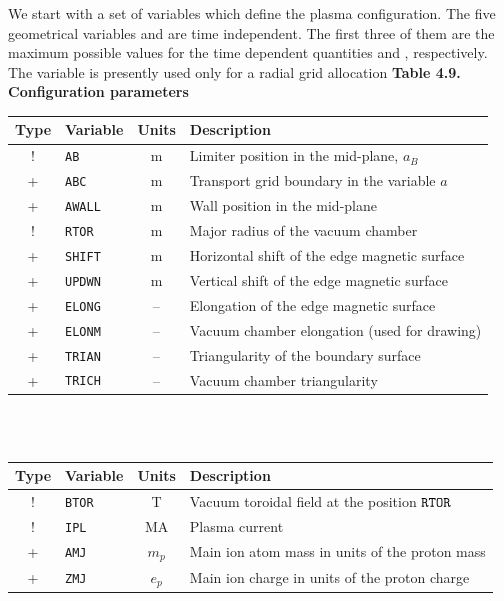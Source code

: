 We start with a set of variables which define the plasma configuration.
The five geometrical variables  and  are time independent.
The first three of them are the maximum possible values for the time
dependent quantities  and , respectively. 
The variable  is  presently used only for a radial grid
allocation 
\linebreak
\indent
{\bf Table 4.9. Configuration parameters}\\[2ex]
\begin{tabular}{|c|l|c|l|}\hline
\hspace*{-1pt}\bf Type\hspace*{-1pt} & \bf Variable 
			&\bf Units &\bf Description\\		\hline
 ! &\tt AB    & m & Limiter position in the mid-plane, $a_B$\\
 + &\tt ABC   & m & Transport grid boundary in the variable $a$\\
 + &\tt AWALL & m & Wall position in the mid-plane\\
 ! &\tt RTOR  & m & Major radius of the vacuum chamber\\
 + &\tt SHIFT & m & Horizontal shift of the edge magnetic surface\\
 + &\tt UPDWN & m & Vertical shift of the edge magnetic surface\\
 + &\tt ELONG & -- & Elongation of the edge magnetic surface\\
 + &\tt ELONM & -- & Vacuum chamber elongation (used for drawing)\\
 + &\tt TRIAN & -- & Triangularity of the boundary surface\\
 + &\tt TRICH & -- & Vacuum chamber triangularity	\\	\hline
\end{tabular}
\bigskip\\
\\[2ex]
\begin{tabular}{| c | l | c | l |}\hline
\hspace*{-1pt}\bf Type\hspace*{-1pt} & \bf Variable 
		& \bf Units & \bf Description \\	\hline
 ! &\tt BTOR &  T  & Vacuum toroidal field at the position $\tt RTOR$\\
 ! &\tt IPL  &  MA & Plasma current\\			
 + &\tt AMJ  &$m_p$& Main ion atom mass in units of the proton mass \\
 + &\tt ZMJ  &$e_p$& Main ion charge in units of the proton charge\\
\hline
\end{tabular}\bigskip\\%
